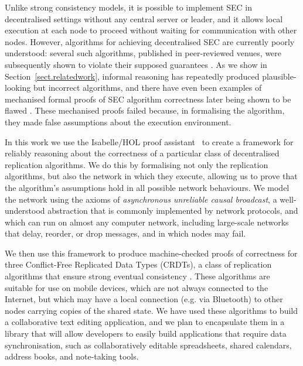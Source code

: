 \documentclass[acmsmall,screen]{acmart}
\begin{document}
Unlike strong consistency models, it is possible to implement SEC in decentralised settings without any central server or leader, and it allows local execution at each node to proceed without waiting for communication with other nodes.
However, algorithms for achieving decentralised SEC are currently poorly understood: several such algorithms, published in peer-reviewed venues, were subsequently shown to violate their supposed guarantees \cite{Imine:2003ks,Imine:2006kn,Oster:2005vi}.
As we show in Section~\ref{sect.relatedwork}, informal reasoning has repeatedly produced plausible-looking but incorrect algorithms, and there have even been examples of mechanised formal proofs of SEC algorithm correctness later being shown to be flawed \cite{Oster:2005vi}.
These mechanised proofs failed because, in formalising the algorithm, they made false assumptions about the execution environment.

In this work we use the Isabelle/HOL proof assistant~\cite{DBLP:conf/tphol/WenzelPN08} to create a framework for reliably reasoning about the correctness of a particular class of decentralised replication algorithms.
We do this by formalising not only the replication algorithms, but also the network in which they execute, allowing us to prove that the algorithm's assumptions hold in all possible network behaviours.
We model the network using the axioms of \emph{asynchronous unreliable causal broadcast}, a well-understood abstraction that is commonly implemented by network protocols, and which can run on almost any computer network, including large-scale networks that delay, reorder, or drop messages, and in which nodes may fail.

We then use this framework to produce machine-checked proofs of correctness for three Conflict-Free Replicated Data Types (CRDTs), a class of replication algorithms that ensure strong eventual consistency \cite{Shapiro:2011wy,Shapiro:2011un}.
These algorithms are suitable for use on mobile devices, which are not always connected to the Internet, but which may have a local connection (e.g. via Bluetooth) to other nodes carrying copies of the shared state.
We have used these algorithms to build a collaborative text editing application, and we plan to encapsulate them in a library that will allow developers to easily build applications that require data synchronisation, such as collaboratively editable spreadsheets, shared calendars, address books, and note-taking tools.
\end{document}
